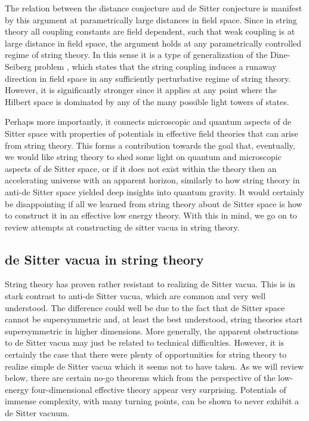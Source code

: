 \documentclass[11pt,a4paper]{article}
\numberwithin{equation}{section}
\numberwithin{table}{section}\setlength{\multlinegap}{25pt}
\begin{document}
{The relation between the distance conjecture and de Sitter conjecture is manifest by this argument at parametrically large distances in field space. Since in string theory all coupling constants are field dependent, such that weak coupling is at large distance in field space, the argument holds at any parametrically controlled regime of string theory. In this sense it is a type of generalization of the Dine-Seiberg problem \cite{Dine:1985he}, which states that the string coupling induces a runaway direction in field space in any sufficiently perturbative regime of string theory. However, it is significantly stronger since it applies at any point where the Hilbert space is dominated by any of the many possible light towers of states. 

Perhaps more importantly, it connects microscopic and quantum aspects of de Sitter space with properties of potentials in effective field theories that can arise from string theory. This forms a contribution towards the goal that, eventually, we would like string theory to shed some light on quantum and microscopic aspects of de Sitter space, or if it does not exist within the theory then an accelerating universe with an apparent horizon, similarly to how string theory in anti-de Sitter space yielded deep insights into quantum gravity. It would certainly be disappointing if all we learned from string theory about de Sitter space is how to construct it in an effective low energy theory. With this in mind, we go on to review attempts at constructing de sitter vacua in string theory.

\subsection{de Sitter vacua in string theory}
\label{sec:testsdS}

String theory has proven rather resistant to realizing de Sitter vacua. This is in stark contrast to anti-de Sitter vacua, which are common and very well understood. The difference could well be due to the fact that de Sitter space cannot be supersymmetric and, at least the best understood, string theories start supersymmetric in higher dimensions. More generally, the apparent obstructions to de Sitter vacua may just be related to technical difficulties. However, it is certainly the case that there were plenty of opportunities for string theory to realize simple de Sitter vacua which it seems not to have taken. As we will review below, there are certain no-go theorems which from the perspective of the low-energy four-dimensional effective theory appear very surprising. Potentials of immense complexity, with many turning points, can be shown to never exhibit a de Sitter vacuum. 

}
\end{document}
